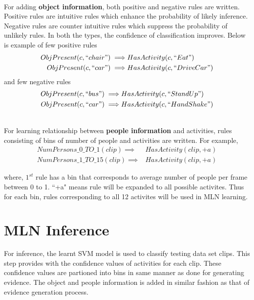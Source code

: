 ~ \\
For adding {\bf object information}, both positive and negative rules are written.
Positive rules are intuitive rules which enhance the probability of likely
inference. Negative rules are counter intuitive rules which suppress the
probability of unlikely rules. In both the types, the confidence of classification
improves. Below is example of few positive rules
\begin{equation}
	\begin{split}
		ObjPresent(c,``chair") \implies & HasActivity(c,``Eat") \\
		ObjPresent(c,``car") \implies & HasActivity(c,``DriveCar")
	\end{split}
\end{equation}
and few negative rules
\begin{equation}
	\begin{split}
		ObjPresent(c,``bus") \implies & HasActivity(c,``StandUp") \\
		ObjPresent(c,``car") \implies & HasActivity(c,``HandShake")
	\end{split}
\end{equation}

~ \\
For learning relationship between {\bf people information} and activities,
rules consisting of bins of number of people and activities are written.
For example,
\begin{equation}
	\begin{split}
		NumPersons\_0\_TO\_1(clip)\implies & HasActivity(clip,+a) \\
		NumPersons\_1\_TO\_15(clip)\implies & HasActivity(clip,+a)
	\end{split}
\end{equation}

where, $1^{st}$ rule has a bin that corresponds to average number of people 
per frame between 0 to 1.
``+a" means rule will be expanded to all possible activites. Thus for each bin,
rules corresponding to all 12 activites will be used in MLN learning.




\section{MLN Inference}
For inference, the learnt SVM model is used to classify testing
data set clips. This step provides with the confidence values of activities for
each clip. These confidence values are partioned into bins in same manner
as done for generating evidence.
The object and people information is added in similar fashion as that of
evidence generation process. 

